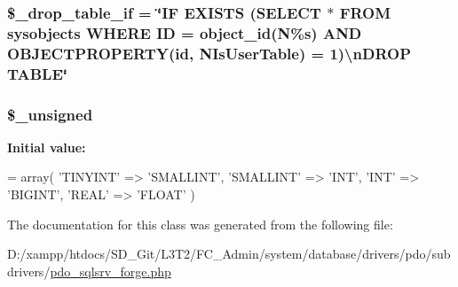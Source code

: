 \subsubsection[{\$\+\_\+drop\+\_\+table\+\_\+if}]{\setlength{\rightskip}{0pt plus 5cm}\$\+\_\+drop\+\_\+table\+\_\+if = \char`\"{}I\+F E\+X\+I\+S\+T\+S (S\+E\+L\+E\+C\+T $\ast$ F\+R\+O\+M sysobjects W\+H\+E\+R\+E I\+D = object\+\_\+id(N\textquotesingle{}\%s\textquotesingle{}) A\+N\+D O\+B\+J\+E\+C\+T\+P\+R\+O\+P\+E\+R\+T\+Y(id, N\textquotesingle{}Is\+User\+Table\textquotesingle{}) = 1)\textbackslash{}n\+D\+R\+O\+P T\+A\+B\+L\+E\char`\"{}\hspace{0.3cm}{\ttfamily [protected]}}\label{class_c_i___d_b__pdo__sqlsrv__forge_a92a8a9145a7fc91e252e58d019373581}
\hypertarget{class_c_i___d_b__pdo__sqlsrv__forge_aae977ae6d61fa183f0b25422b6ddc31c}{}
\subsubsection[{\$\+\_\+unsigned}]{\setlength{\rightskip}{0pt plus 5cm}\$\+\_\+unsigned\hspace{0.3cm}{\ttfamily [protected]}}\label{class_c_i___d_b__pdo__sqlsrv__forge_aae977ae6d61fa183f0b25422b6ddc31c}
{\bfseries Initial value\+:}
\begin{DoxyCode}
= array(
        \textcolor{stringliteral}{'TINYINT'}   => \textcolor{stringliteral}{'SMALLINT'},
        \textcolor{stringliteral}{'SMALLINT'}  => \textcolor{stringliteral}{'INT'},
        \textcolor{stringliteral}{'INT'}       => \textcolor{stringliteral}{'BIGINT'},
        \textcolor{stringliteral}{'REAL'}      => \textcolor{stringliteral}{'FLOAT'}
    )
\end{DoxyCode}


The documentation for this class was generated from the following file\+:\begin{DoxyCompactItemize}
\item 
D\+:/xampp/htdocs/\+S\+D\+\_\+\+Git/\+L3\+T2/\+F\+C\+\_\+\+Admin/system/database/drivers/pdo/subdrivers/\hyperlink{pdo__sqlsrv__forge_8php}{pdo\+\_\+sqlsrv\+\_\+forge.\+php}\end{DoxyCompactItemize}
